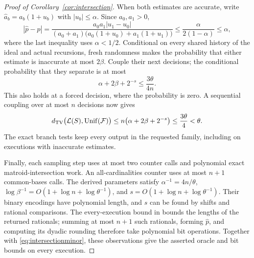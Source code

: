 \documentclass[11pt]{article}
\theoremstyle{definition}
\begin{document}
\begin{proof}[Proof of Corollary~\ref{cor:intersection}]
When both estimates are accurate, write
$\widehat a_b=a_b(1+u_b)$ with $|u_b|\le\alpha$.  Since $a_0,a_1>0$,
\[
 |\widehat p-p|
 =\frac{a_0a_1|u_1-u_0|}
 {(a_0+a_1)\bigl(a_0(1+u_0)+a_1(1+u_1)\bigr)}
 \le\frac{\alpha}{2(1-\alpha)}
 \le\alpha,
\]
where the last inequality uses $\alpha<1/2$.  Conditional on every
shared history of the ideal and actual recursions, fresh randomness
makes the probability that either estimate is inaccurate at most $2\beta$.
Couple their next decisions; the conditional probability that they
separate is at most
\[
 \alpha+2\beta+2^{-s}\le\frac{3\theta}{4n}.
\]
This also holds at a forced decision, where the probability is zero.
A sequential coupling over at most $n$ decisions now gives
\[
 d_{\rm TV}\bigl(\mathcal L(S),\operatorname{Unif}(\mathcal F)\bigr)
 \le n\bigl(\alpha+2\beta+2^{-s}\bigr)
 \le\frac{3\theta}{4}<\theta.
\]
The exact branch tests keep every output in the requested family, including on
executions with inaccurate estimates.

Finally, each sampling step uses at most two counter calls and
polynomial exact matroid-intersection work.  An all-cardinalities
counter uses at most $n+1$ common-bases calls.  The derived parameters
satisfy $\alpha^{-1}=4n/\theta$,
$\log\beta^{-1}=O(1+\log n+\log\theta^{-1})$, and
$s=O(1+\log n+\log\theta^{-1})$.  Their binary encodings have polynomial
length, and $s$ can be found by shifts and rational comparisons.
The every-execution bound in  bounds the lengths
of the returned rationals; summing at most $n+1$ such rationals,
forming $\widehat p$, and computing its dyadic rounding therefore take
polynomial bit operations.  Together with
\eqref{eq:intersectionminor}, these observations give the asserted
oracle and bit bounds on every execution.
\end{proof}

\clearpage
\end{document}
